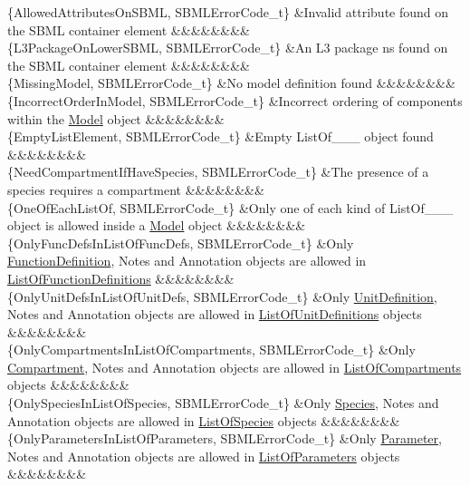 \begin{DoxyParagraph}{}
\begin{longtabu}
\{Allowed\+Attributes\+On\+S\+B\+ML, S\+B\+M\+L\+Error\+Code\+\_\+t\} &Invalid attribute found on the S\+B\+ML container element &&&&&&&&\\
\{L3\+Package\+On\+Lower\+S\+B\+ML, S\+B\+M\+L\+Error\+Code\+\_\+t\} &An L3 package ns found on the S\+B\+ML container element &&&&&&&&\\
\{Missing\+Model, S\+B\+M\+L\+Error\+Code\+\_\+t\} &No model definition found &&&&&&&&\\
\{Incorrect\+Order\+In\+Model, S\+B\+M\+L\+Error\+Code\+\_\+t\} &Incorrect ordering of components within the \hyperlink{class_model}{Model} object &&&&&&&&\\
\{Empty\+List\+Element, S\+B\+M\+L\+Error\+Code\+\_\+t\} &Empty List\+Of\+\_\+\+\_\+\+\_\+ object found &&&&&&&&\\
\{Need\+Compartment\+If\+Have\+Species, S\+B\+M\+L\+Error\+Code\+\_\+t\} &The presence of a species requires a compartment &&&&&&&&\\
\{One\+Of\+Each\+List\+Of, S\+B\+M\+L\+Error\+Code\+\_\+t\} &Only one of each kind of List\+Of\+\_\+\+\_\+\+\_\+ object is allowed inside a \hyperlink{class_model}{Model} object &&&&&&&&\\
\{Only\+Func\+Defs\+In\+List\+Of\+Func\+Defs, S\+B\+M\+L\+Error\+Code\+\_\+t\} &Only \hyperlink{class_function_definition}{Function\+Definition}, Notes and Annotation objects are allowed in \hyperlink{class_list_of_function_definitions}{List\+Of\+Function\+Definitions} &&&&&&&&\\
\{Only\+Unit\+Defs\+In\+List\+Of\+Unit\+Defs, S\+B\+M\+L\+Error\+Code\+\_\+t\} &Only \hyperlink{class_unit_definition}{Unit\+Definition}, Notes and Annotation objects are allowed in \hyperlink{class_list_of_unit_definitions}{List\+Of\+Unit\+Definitions} objects &&&&&&&&\\
\{Only\+Compartments\+In\+List\+Of\+Compartments, S\+B\+M\+L\+Error\+Code\+\_\+t\} &Only \hyperlink{class_compartment}{Compartment}, Notes and Annotation objects are allowed in \hyperlink{class_list_of_compartments}{List\+Of\+Compartments} objects &&&&&&&&\\
\{Only\+Species\+In\+List\+Of\+Species, S\+B\+M\+L\+Error\+Code\+\_\+t\} &Only \hyperlink{class_species}{Species}, Notes and Annotation objects are allowed in \hyperlink{class_list_of_species}{List\+Of\+Species} objects &&&&&&&&\\
\{Only\+Parameters\+In\+List\+Of\+Parameters, S\+B\+M\+L\+Error\+Code\+\_\+t\} &Only \hyperlink{class_parameter}{Parameter}, Notes and Annotation objects are allowed in \hyperlink{class_list_of_parameters}{List\+Of\+Parameters} objects &&&&&&&&\\

\end{longtabu}
\end{DoxyParagraph}
